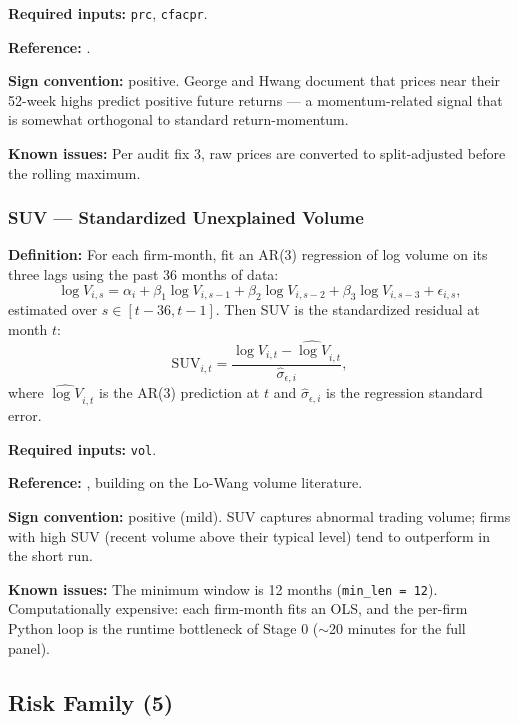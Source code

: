 \textbf{Required inputs:} \texttt{prc}, \texttt{cfacpr}.

\textbf{Reference:} \cite{GeorgeHwang2004}.

\textbf{Sign convention:} positive. George and Hwang document that
prices near their 52-week highs predict positive future returns ---
a momentum-related signal that is somewhat orthogonal to standard
return-momentum.

\textbf{Known issues:} Per audit fix 3, raw prices are converted to
split-adjusted before the rolling maximum.

\subsubsection{SUV --- Standardized Unexplained Volume}

\textbf{Definition:} For each firm-month, fit an AR(3) regression of
log volume on its three lags using the past 36 months of data:
\begin{equation}
\log V_{i,s} = \alpha_i + \beta_1 \log V_{i,s-1} + \beta_2 \log V_{i,s-2}
              + \beta_3 \log V_{i,s-3} + \epsilon_{i,s},
\label{eq:suv-fit}
\end{equation}
estimated over $s \in [t - 36, t - 1]$. Then SUV is the standardized
residual at month $t$:
\begin{equation}
\mathrm{SUV}_{i,t} = \frac{\log V_{i,t} - \widehat{\log V}_{i,t}}
                          {\widehat{\sigma}_{\epsilon, i}},
\label{eq:suv}
\end{equation}
where $\widehat{\log V}_{i,t}$ is the AR(3) prediction at $t$ and
$\widehat{\sigma}_{\epsilon, i}$ is the regression standard error.

\textbf{Required inputs:} \texttt{vol}.

\textbf{Reference:} \cite{Garfinkel2009}, building on the
Lo-Wang volume literature.

\textbf{Sign convention:} positive (mild). SUV captures abnormal
trading volume; firms with high SUV (recent volume above their
typical level) tend to outperform in the short run.

\textbf{Known issues:} The minimum window is 12 months
(\texttt{min\_len = 12}). Computationally expensive: each firm-month
fits an OLS, and the per-firm Python loop is the runtime bottleneck of
Stage 0 (\(\sim\)20 minutes for the full panel).

\subsection{Risk Family (5)}
\label{subsec:stage0-risk}

